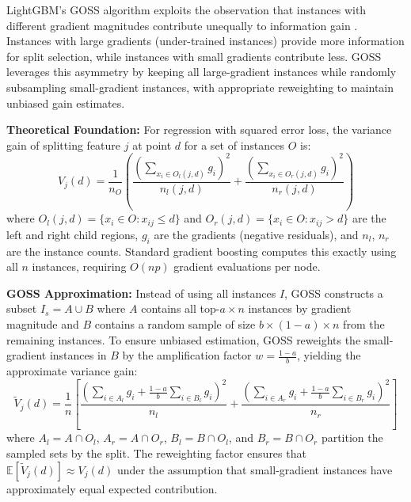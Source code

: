 \documentclass[10pt,twocolumn]{article}
\begin{document}
LightGBM's GOSS algorithm exploits the observation that instances with different gradient magnitudes contribute unequally to information gain \cite{ke2017lightgbm}. Instances with large gradients (under-trained instances) provide more information for split selection, while instances with small gradients contribute less. GOSS leverages this asymmetry by keeping all large-gradient instances while randomly subsampling small-gradient instances, with appropriate reweighting to maintain unbiased gain estimates.

\textbf{Theoretical Foundation:} For regression with squared error loss, the variance gain of splitting feature $j$ at point $d$ for a set of instances $O$ is:
\begin{equation}
V_j(d) = \frac{1}{n_O}\left(\frac{(\sum_{x_i \in O_l(j,d)} g_i)^2}{n_l(j,d)} + \frac{(\sum_{x_i \in O_r(j,d)} g_i)^2}{n_r(j,d)}\right)
\end{equation}
where $O_l(j,d) = \{x_i \in O : x_{ij} \leq d\}$ and $O_r(j,d) = \{x_i \in O : x_{ij} > d\}$ are the left and right child regions, $g_i$ are the gradients (negative residuals), and $n_l$, $n_r$ are the instance counts. Standard gradient boosting computes this exactly using all $n$ instances, requiring $O(np)$ gradient evaluations per node.

\textbf{GOSS Approximation:} Instead of using all instances $I$, GOSS constructs a subset $I_s = A \cup B$ where $A$ contains all top-$a \times n$ instances by gradient magnitude and $B$ contains a random sample of size $b \times (1-a) \times n$ from the remaining instances. To ensure unbiased estimation, GOSS reweights the small-gradient instances in $B$ by the amplification factor $w = \frac{1-a}{b}$, yielding the approximate variance gain:
\begin{equation}
\tilde{V}_j(d) = \frac{1}{n}\left[\frac{\left(\sum_{i \in A_l} g_i + \frac{1-a}{b}\sum_{i \in B_l} g_i\right)^2}{n_l} + \frac{\left(\sum_{i \in A_r} g_i + \frac{1-a}{b}\sum_{i \in B_r} g_i\right)^2}{n_r}\right]
\end{equation}
where $A_l = A \cap O_l$, $A_r = A \cap O_r$, $B_l = B \cap O_l$, and $B_r = B \cap O_r$ partition the sampled sets by the split. The reweighting factor ensures that $\mathbb{E}[\tilde{V}_j(d)] \approx V_j(d)$ under the assumption that small-gradient instances have approximately equal expected contribution.
\end{document}

